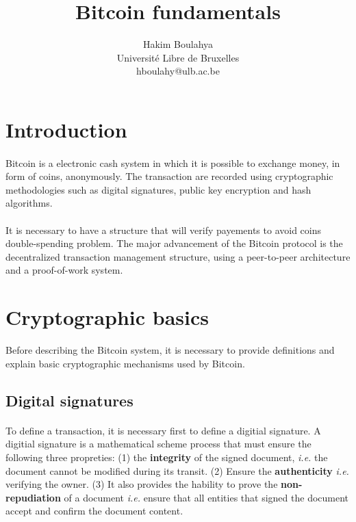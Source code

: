 \documentclass[letterpaper]{article}
\title{Bitcoin fundamentals}
\author{Hakim Boulahya \\
Université Libre de Bruxelles\\
hboulahy@ulb.ac.be}
\begin{document}
\maketitle



\section*{Introduction}

\paragraph{}
Bitcoin is a electronic cash system in which it is possible to exchange
money, in form of coins, anonymously.
The transaction are recorded
using cryptographic methodologies such as digital signatures,
public key encryption and hash algorithms.

\paragraph{}
It is necessary to have a structure that will verify payements to
avoid coins double-spending problem.
The major advancement of the Bitcoin protocol
is the decentralized transaction management structure,
using a peer-to-peer architecture and a proof-of-work system.

\section{Cryptographic basics}
Before describing the Bitcoin system, it is necessary to provide definitions
and explain basic cryptographic mechanisms used by Bitcoin.

\subsection{Digital signatures}

\paragraph{}
To define a transaction, it is necessary first to define a digitial signature.
A digitial signature is a mathematical scheme process that must ensure
the following three propreties: (1) the \textbf{integrity} of the signed document,
\textit{i.e.} the document cannot be modified during its transit. (2) Ensure
the \textbf{authenticity} \textit{i.e.} verifying the owner.
(3) It also provides the hability to prove the \textbf{non-repudiation}
of a document \textit{i.e.} ensure that all entities that signed the
document accept and confirm the document content.
\end{document}

